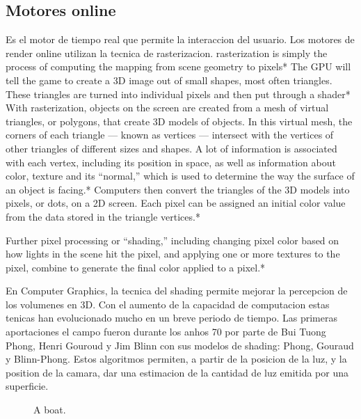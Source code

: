     \subsection{Motores online}
        Es el motor de tiempo real que permite la interaccion del usuario.
        Los motores de render online utilizan la tecnica de rasterizacion. 
        rasterization is simply the process of computing the mapping from scene geometry to pixels* 
        The GPU will tell the game to create a 3D image out of small shapes, most often triangles. These triangles are turned into individual pixels and then put through a shader* 
        With rasterization, objects on the screen are created from a mesh of virtual triangles, or polygons, that create 3D models of objects. In this virtual mesh, the corners of each triangle — known as vertices — intersect with the vertices of other triangles of different sizes and shapes. A lot of information is associated with each vertex, including its position in space, as well as information about color, texture and its “normal,” which is used to determine the way the surface of an object is facing.*
        Computers then convert the triangles of the 3D models into pixels, or dots, on a 2D screen. Each pixel can be assigned an initial color value from the data stored in the triangle vertices.*

        Further pixel processing or “shading,” including changing pixel color based on how lights in the scene hit the pixel, and applying one or more textures to the pixel, combine to generate the final color applied to a pixel.*

        En Computer Graphics, la tecnica del shading permite mejorar la percepcion de
        los volumenes en 3D. Con el aumento de la capacidad de computacion estas tenicas
        han evolucionado mucho en un breve periodo de tiempo.
        Las primeras aportaciones el campo fueron durante los anhos 70 por parte de Bui
        Tuong Phong, Henri Gouroud y Jim Blinn con sus modelos de shading: Phong\autocite{phong}, Gouraud\autocite{gouraud}
        y Blinn-Phong\autocite{blinnphong}. Estos algoritmos permiten, a partir de la posicion de la luz, y la
        position de la camara, dar una estimacion de la cantidad de luz emitida por una
        superficie.
    \singlespacing

\begin{figure}[H]
\setlength{\fboxsep}{0pt}
\caption{A boat.}
\singlespacing
\end{figure}

